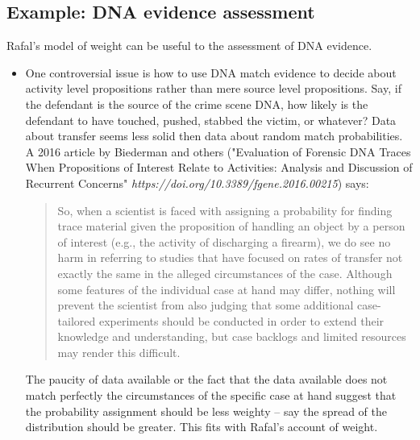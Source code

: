 \documentclass[
  10pt,
  dvipsnames,enabledeprecatedfontcommands]{scrartcl}
\begin{document}

\hypertarget{example-dna-evidence-assessment}{%
\subsection{Example: DNA evidence
assessment}\label{example-dna-evidence-assessment}}

Rafal's model of weight can be useful to the assessment of DNA evidence.

\begin{itemize}
 
 \item One controversial issue is  how to use DNA match evidence to decide about activity level propositions rather than mere source level propositions. Say, if the defendant is the source of the crime scene DNA, how likely is the defendant to have touched, pushed, stabbed the victim, or whatever? Data about transfer seems less solid then data about random match probabilities. A 2016 article by Biederman and others ("Evaluation of Forensic DNA Traces When Propositions of Interest Relate to Activities: Analysis and Discussion of Recurrent Concerns" \textit{https://doi.org/10.3389/fgene.2016.00215}) says:
 \begin{quote}
 So, when a scientist is faced with assigning a probability for finding trace material given the proposition of handling an object by a person of interest (e.g., the activity of discharging a firearm), we do see no harm in referring to studies that have focused on rates of transfer not exactly the same in the alleged circumstances of the case. Although some features of the individual case at hand may differ, nothing will prevent the scientist from also judging that some additional case-tailored experiments should be conducted in order to extend their knowledge and understanding, but case backlogs and limited resources may render this difficult.
\end{quote} 
 The paucity of data available or the fact that the data available does not match perfectly the circumstances of the specific case at hand suggest that the probability assignment should be less weighty -- say the spread of the distribution should be greater. This fits with Rafal's account of weight.
 
 

\end{itemize}
\end{document}
